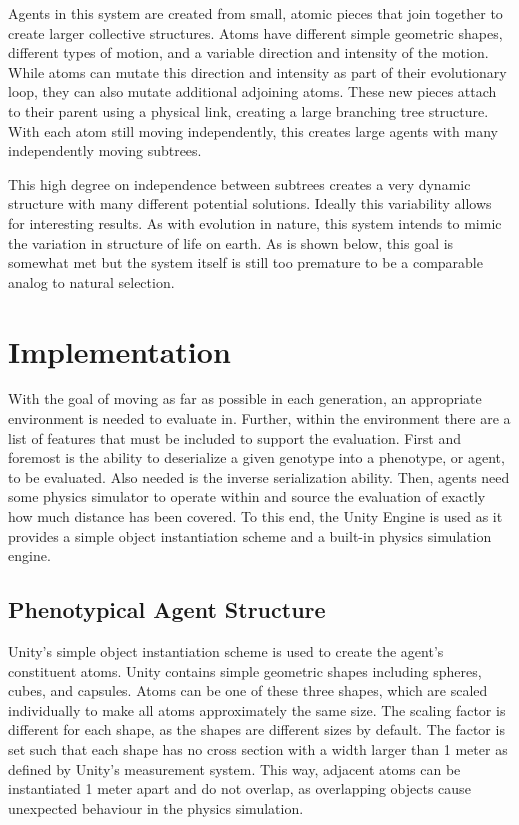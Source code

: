 \documentclass[runningheads]{llncs}
\begin{document}
Agents in this system are created from small, atomic pieces that join together to create larger collective structures.
Atoms have different simple geometric shapes, different types of motion, and a variable direction and intensity of the motion.
While atoms can mutate this direction and intensity as part of their evolutionary loop, they can also mutate additional adjoining atoms.
These new pieces attach to their parent using a physical link, creating a large branching tree structure.
With each atom still moving independently, this creates large agents with many independently moving subtrees.

This high degree on independence between subtrees creates a very dynamic structure with many different potential solutions.
Ideally this variability allows for interesting results.
As with evolution in nature, this system intends to mimic the variation in structure of life on earth.
As is shown below, this goal is somewhat met but the system itself is still too premature to be a comparable analog to natural selection.

\section{Implementation}
With the goal of moving as far as possible in each generation, an appropriate environment is needed to evaluate in.
Further, within the environment there are a list of features that must be included to support the evaluation.
First and foremost is the ability to deserialize a given genotype into a phenotype, or agent, to be evaluated.
Also needed is the inverse serialization ability.
Then, agents need some physics simulator to operate within and source the evaluation of exactly how much distance has been covered.
To this end, the Unity Engine is used as it provides a simple object instantiation scheme and a built-in physics simulation engine.

\subsection{Phenotypical Agent Structure}
Unity's simple object instantiation scheme is used to create the agent's constituent atoms.
Unity contains simple geometric shapes including spheres, cubes, and capsules.
Atoms can be one of these three shapes, which are scaled individually to make all atoms approximately the same size.
The scaling factor is different for each shape, as the shapes are different sizes by default.
The factor is set such that each shape has no cross section with a width larger than 1 meter as defined by Unity's measurement system.
This way, adjacent atoms can be instantiated 1 meter apart and do not overlap, as overlapping objects cause unexpected behaviour in the physics simulation.
\end{document}
